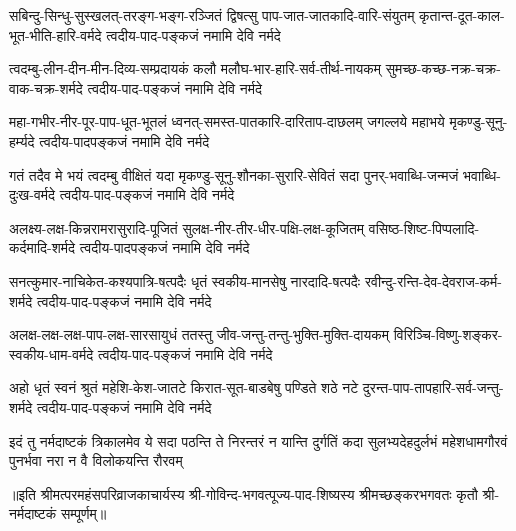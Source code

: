 
\fourlineindentedshloka
{सबिन्दु-सिन्धु-सुस्खलत्-तरङ्ग-भङ्ग-रञ्जितं}
{द्विषत्सु पाप-जात-जातकादि-वारि-संयुतम्}
{कृतान्त-दूत-काल-भूत-भीति-हारि-वर्मदे}
{त्वदीय-पाद-पङ्कजं नमामि देवि नर्मदे} %

\fourlineindentedshloka
{त्वदम्बु-लीन-दीन-मीन-दिव्य-सम्प्रदायकं}
{कलौ मलौघ-भार-हारि-सर्व-तीर्थ-नायकम्}
{सुमच्छ-कच्छ-नक्र-चक्र-वाक-चक्र-शर्मदे}
{त्वदीय-पाद-पङ्कजं नमामि देवि नर्मदे} %

\fourlineindentedshloka
{महा-गभीर-नीर-पूर-पाप-धूत-भूतलं}
{ध्वनत्-समस्त-पातकारि-दारिताप-दाछलम्}
{जगल्लये महाभये मृकण्डु-सूनु-हर्म्यदे}
{त्वदीय-पादपङ्कजं नमामि देवि नर्मदे} %

\fourlineindentedshloka
{गतं तदैव मे भयं त्वदम्बु वीक्षितं यदा}
{मृकण्डु-सूनु-शौनका-सुरारि-सेवितं सदा}
{पुनर्-भवाब्धि-जन्मजं भवाब्धि-दुःख-वर्मदे}
{त्वदीय-पाद-पङ्कजं नमामि देवि नर्मदे} %

\fourlineindentedshloka
{अलक्ष्य-लक्ष-किन्नरामरासुरादि-पूजितं}
{सुलक्ष-नीर-तीर-धीर-पक्षि-लक्ष-कूजितम्}
{वसिष्ठ-शिष्ट-पिप्पलादि-कर्दमादि-शर्मदे}
{त्वदीय-पादपङ्कजं नमामि देवि नर्मदे} %

\fourlineindentedshloka
{सनत्कुमार-नाचिकेत-कश्यपात्रि-षत्पदैः}
{धृतं स्वकीय-मानसेषु नारदादि-षत्पदैः}
{रवीन्दु-रन्ति-देव-देवराज-कर्म-शर्मदे}
{त्वदीय-पाद-पङ्कजं नमामि देवि नर्मदे} %

\fourlineindentedshloka
{अलक्ष-लक्ष-लक्ष-पाप-लक्ष-सारसायुधं}
{ततस्तु जीव-जन्तु-तन्तु-भुक्ति-मुक्ति-दायकम्}
{विरिञ्चि-विष्णु-शङ्कर-स्वकीय-धाम-वर्मदे}
{त्वदीय-पाद-पङ्कजं नमामि देवि नर्मदे} %

\fourlineindentedshloka
{अहो धृतं स्वनं श्रुतं महेशि-केश-जातटे}
{किरात-सूत-बाडबेषु पण्डिते शठे नटे}
{दुरन्त-पाप-तापहारि-सर्व-जन्तु-शर्मदे}
{त्वदीय-पाद-पङ्कजं नमामि देवि नर्मदे} %

\fourlineindentedshloka
{इदं तु नर्मदाष्टकं त्रिकालमेव ये सदा}
{पठन्ति ते निरन्तरं न यान्ति दुर्गतिं कदा}
{सुलभ्यदेहदुर्लभं महेशधामगौरवं}
{पुनर्भवा नरा न वै विलोकयन्ति रौरवम्} %

॥इति श्रीमत्परमहंसपरिव्राजकाचार्यस्य श्री-गोविन्द-भगवत्पूज्य-पाद-शिष्यस्य
श्रीमच्छङ्करभगवतः कृतौ श्री-नर्मदाष्टकं सम्पूर्णम्॥